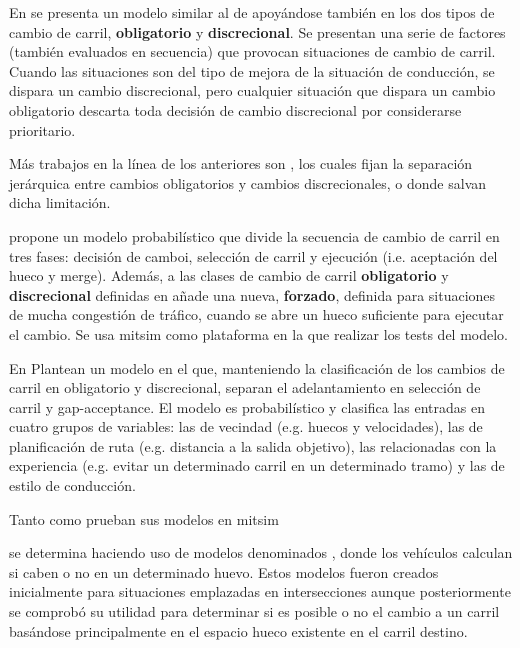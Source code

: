 En \cite{Hidas2002} se presenta un modelo similar al de \cite{Gipps1986} apoyándose también en los dos tipos de cambio de carril, \textbf{obligatorio} y \textbf{discrecional}. Se presentan una serie de factores (también evaluados en secuencia) que provocan situaciones de cambio de carril. Cuando las situaciones son del tipo de mejora de la situación de conducción, se dispara un cambio discrecional, pero cualquier situación que dispara un cambio obligatorio descarta toda decisión de cambio discrecional por considerarse prioritario.

Más trabajos en la línea de los anteriores son \cite{Halati1997, Yang1996, Ahmed1999}, los cuales fijan la separación jerárquica entre cambios obligatorios y cambios discrecionales, o \cite{Toledo2003, Wei2000} donde salvan dicha limitación.

\cite{Ahmed1999} propone un modelo probabilístico que divide la secuencia de cambio de carril en tres fases: decisión de camboi, selección de carril y ejecución (i.e. aceptación del hueco y merge). Además, a las clases de cambio de carril \textbf{obligatorio} y \textbf{discrecional} definidas en \cite{Gipps1986} añade una nueva, \textbf{forzado}, definida para situaciones de mucha congestión de tráfico, cuando se abre un hueco suficiente para ejecutar el cambio. Se usa \gls{mitsim} como plataforma en la que realizar los tests del modelo.

En \cite{Toledo2003, Toledo2009} Plantean un modelo en el que, manteniendo la clasificación de los cambios de carril en obligatorio y discrecional, separan el adelantamiento en selección de carril y gap-acceptance. El modelo es probabilístico y clasifica las entradas en cuatro grupos de variables: las de vecindad (e.g. huecos y velocidades), las de planificación de ruta (e.g. distancia a la salida objetivo), las relacionadas con la experiencia (e.g. evitar un determinado carril en un determinado tramo) y las de estilo de conducción.

Tanto \cite{Ahmed1999} como \cite{Toledo2003, Toledo2009} prueban sus modelos en \gls{mitsim}


 se determina haciendo uso de modelos denominados \textit{}, donde los vehículos calculan si caben o no en un determinado huevo. Estos modelos fueron creados inicialmente para situaciones emplazadas en intersecciones aunque posteriormente se comprobó su utilidad para determinar si es posible o no el cambio a un carril basándose principalmente en el espacio hueco existente en el carril destino.

